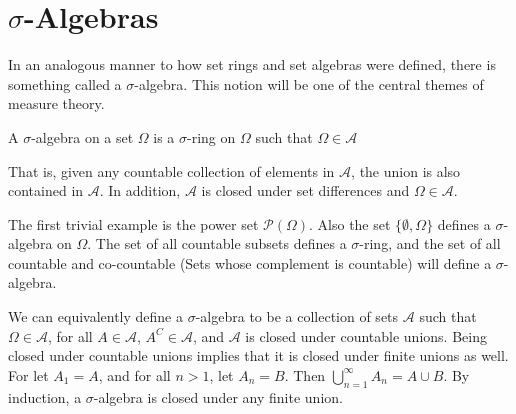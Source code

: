 \section{\texorpdfstring{$\sigma$}{Sigma}-Algebras}
    In an analogous manner to how set rings and set algebras
    were defined, there is something called a $\sigma$-algebra.
    This notion will be one of the central themes of measure
    theory.
    \begin{definition}
        A $\sigma$-algebra on a set $\Omega$ is a
        $\sigma$-ring on $\Omega$ such that
        $\Omega\in\mathcal{A}$
    \end{definition}
    That is, given any countable collection of elements in
    $\mathcal{A}$, the union is also contained in
    $\mathcal{A}$. In addition, $\mathcal{A}$ is closed under
    set differences and $\Omega\in\mathcal{A}$.
    \begin{example}
        The first trivial example is the power set
        $\mathcal{P}(\Omega)$. Also the set
        $\{\emptyset,\Omega\}$ defines a $\sigma$-algebra on
        $\Omega$. The set of all countable subsets defines
        a $\sigma$-ring, and the set of all countable and
        co-countable (Sets whose complement is countable)
        will define a $\sigma$-algebra.
    \end{example}
    We can equivalently define a $\sigma$-algebra to be a
    collection of sets $\mathcal{A}$ such that
    $\Omega\in\mathcal{A}$, for all $A\in\mathcal{A}$,
    $A^{C}\in\mathcal{A}$, and $\mathcal{A}$ is closed under
    countable unions. Being closed under countable unions
    implies that it is closed under finite unions as well.
    For let $A_{1}=A$, and for all $n>1$, let $A_{n}=B$.
    Then $\bigcup_{n=1}^{\infty}A_{n}=A\cup{B}$. By induction,
    a $\sigma$-algebra is closed under any finite union.